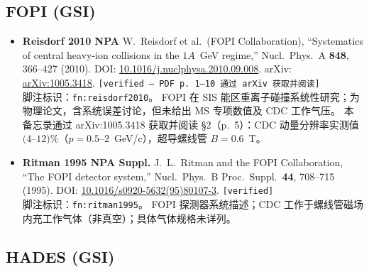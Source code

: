 \documentclass[a4paper, 11pt]{article}
\begin{document}
\subsection{FOPI (GSI)}

\begin{itemize}[leftmargin=2em,itemsep=3pt]

\item \textbf{Reisdorf 2010 NPA} \quad
W.~Reisdorf et al.\ (FOPI Collaboration), ``Systematics of central heavy-ion collisions in the $1A$~GeV regime,''
Nucl.\ Phys.\ A \textbf{848}, 366--427 (2010).
DOI: \href{https://doi.org/10.1016/j.nuclphysa.2010.09.008}{10.1016/j.nuclphysa.2010.09.008}.
arXiv: \href{https://arxiv.org/abs/1005.3418}{arXiv:1005.3418}.
\texttt{[verified --- PDF p.~1--10 通过 arXiv 获取并阅读]}
\\
脚注标识：\texttt{fn:reisdorf2010}。
FOPI 在 SIS 能区重离子碰撞系统性研究；为物理论文，含系统误差讨论，但未给出 MS 专项数值及 CDC 工作气压。
本备忘录通过 arXiv:1005.3418 获取并阅读 §2（p.~5）：CDC 动量分辨率实测值 $(4$--$12)\%$（$p = 0.5$--$2$~GeV/c），超导螺线管 $B = 0.6$~T。

\item \textbf{Ritman 1995 NPA Suppl.} \quad
J.~L.~Ritman and the FOPI Collaboration, ``The FOPI detector system,''
Nucl.\ Phys.\ B Proc.\ Suppl.\ \textbf{44}, 708--715 (1995).
DOI: \href{https://doi.org/10.1016/s0920-5632(95)80107-3}{10.1016/s0920-5632(95)80107-3}.
\texttt{[verified]}
\\
脚注标识：\texttt{fn:ritman1995}。
FOPI 探测器系统描述；CDC 工作于螺线管磁场内充工作气体（非真空）；具体气体规格未详列。

\end{itemize}

\subsection{HADES (GSI)}
\end{document}
